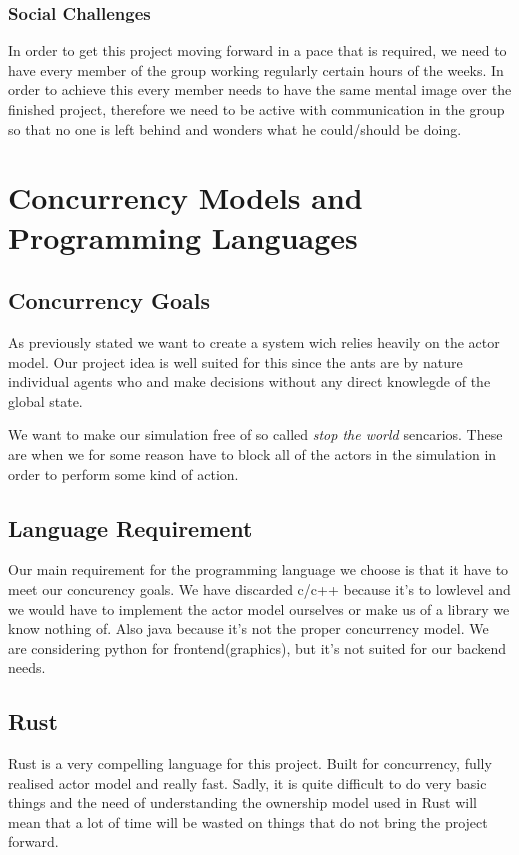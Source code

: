 \documentclass[a4paper]{article}
\begin{document}
\subsubsection{Social Challenges}
In order to get this project moving forward in a pace that is required, we need
to have every member of the group working regularly certain hours of the weeks.
In order to achieve this every member needs to have the same mental image over
the finished project, therefore we need to be active with communication in the
group so that no one is left behind and wonders what he could/should be doing.

\section{Concurrency Models and Programming Languages}

\subsection{Concurrency Goals}
As previously stated we want to create a system wich relies heavily on the actor
model. Our project idea is well suited for this since the ants are by nature
individual agents who and make decisions without any direct knowlegde of the
global state.

We want to make our simulation free of so called \emph{stop the world}
sencarios. These are when we for some reason have to block all of the actors in
the simulation in order to perform some kind of action.

\subsection{Language Requirement}
Our main requirement for the programming language we choose is that it have to meet our concurency goals.
We have discarded c/c++ because it's to lowlevel and we would have to implement the actor model ourselves or make us of a library we know nothing of. 
Also java because it's not the proper concurrency model. We are considering python for frontend(graphics),
but it's not suited for our backend needs.

\subsection{Rust}
Rust is a very compelling language for this project. Built for concurrency, fully realised
actor model and really fast. Sadly, it is quite difficult to do very basic things and the need
of understanding the ownership model used in Rust will mean that a lot of time will be wasted
on things that do not bring the project forward. 
\end{document}
